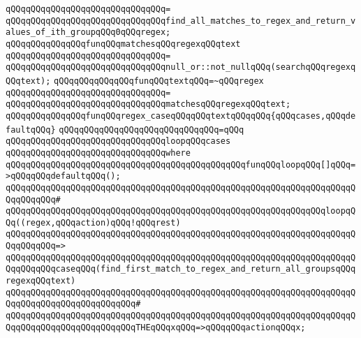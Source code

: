 \verb|qQQqqQQqqQQqqQQqqQQqqQQqqQQqqQQq=|\newline
\verb|qQQqqQQqqQQqqQQqqQQqqQQqqQQqqQQqfind_all_matches_to_regex_and_return_values_of_ith_groupqQQq0qQQqregex;|\newline
\newline
\newline
\verb|qQQqqQQqqQQqqQQqfunqQQqmatchesqQQqregexqQQqtext|\newline
\verb|qQQqqQQqqQQqqQQqqQQqqQQqqQQqqQQq=|\newline
\verb|qQQqqQQqqQQqqQQqqQQqqQQqqQQqqQQqnull_or::not_nullqQQq(searchqQQqregexqQQqtext);|\newline
\newline
\newline
\verb|qQQqqQQqqQQqqQQqfunqQQqtextqQQq=~qQQqregex|\newline
\verb|qQQqqQQqqQQqqQQqqQQqqQQqqQQqqQQq=|\newline
\verb|qQQqqQQqqQQqqQQqqQQqqQQqqQQqqQQqmatchesqQQqregexqQQqtext;|\newline
\newline
\verb|qQQqqQQqqQQqqQQqfunqQQqregex_caseqQQqqQQqtextqQQqqQQq{qQQqcases,qQQqdefaultqQQq}|\newline
\verb|qQQqqQQqqQQqqQQqqQQqqQQqqQQqqQQq=qQQq|\newline
\verb|qQQqqQQqqQQqqQQqqQQqqQQqqQQqqQQqloopqQQqcases|\newline
\verb|qQQqqQQqqQQqqQQqqQQqqQQqqQQqqQQqwhere|\newline
\verb|qQQqqQQqqQQqqQQqqQQqqQQqqQQqqQQqqQQqqQQqqQQqqQQqfunqQQqloopqQQq[]qQQq=>qQQqqQQqdefaultqQQq();|\newline
\verb|qQQqqQQqqQQqqQQqqQQqqQQqqQQqqQQqqQQqqQQqqQQqqQQqqQQqqQQqqQQqqQQqqQQqqQQqqQQqqQQq#|\newline
\verb|qQQqqQQqqQQqqQQqqQQqqQQqqQQqqQQqqQQqqQQqqQQqqQQqqQQqqQQqqQQqqQQqloopqQQq((regex,qQQqaction)qQQq!qQQqrest)|\newline
\verb|qQQqqQQqqQQqqQQqqQQqqQQqqQQqqQQqqQQqqQQqqQQqqQQqqQQqqQQqqQQqqQQqqQQqqQQqqQQqqQQq=>|\newline
\verb|qQQqqQQqqQQqqQQqqQQqqQQqqQQqqQQqqQQqqQQqqQQqqQQqqQQqqQQqqQQqqQQqqQQqqQQqqQQqqQQqcaseqQQq(find_first_match_to_regex_and_return_all_groupsqQQqregexqQQqtext)|\newline
\verb|qQQqqQQqqQQqqQQqqQQqqQQqqQQqqQQqqQQqqQQqqQQqqQQqqQQqqQQqqQQqqQQqqQQqqQQqqQQqqQQqqQQqqQQqqQQqqQQq#|\newline
\verb|qQQqqQQqqQQqqQQqqQQqqQQqqQQqqQQqqQQqqQQqqQQqqQQqqQQqqQQqqQQqqQQqqQQqqQQqqQQqqQQqqQQqqQQqqQQqqQQqTHEqQQqxqQQq=>qQQqqQQqactionqQQqx;|\newline
